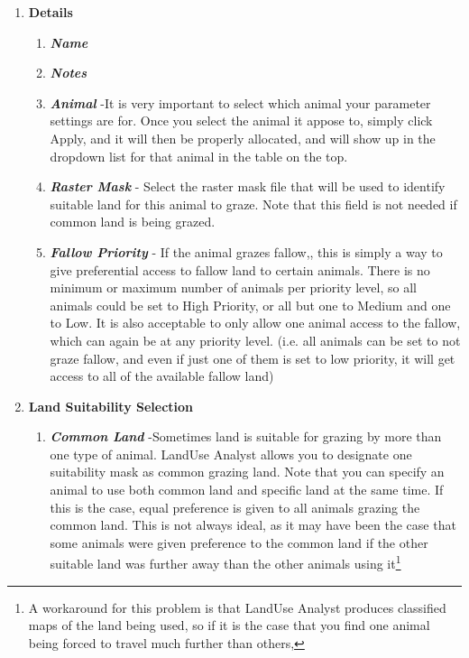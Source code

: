   \begin{enumerate}
    \item \textbf{Details}
      \begin{enumerate}
        \item \textit{\textbf{Name}}
        \item \textit{\textbf{Notes}} 
        \item \textit{\textbf{Animal}} -It is very important to select which
animal your parameter settings are for. Once you select the animal it appose to,
simply click Apply, and it will then be properly allocated, and will show up in
the dropdown list for that animal in the table on the top. 
        \item \textit{\textbf{Raster Mask}} - Select the raster mask file that
will be used to identify suitable land for this animal to graze.  Note that this
field is not needed if common land is being grazed.
        \item \textit{\textbf{Fallow Priority}} - If the animal grazes fallow,,
this is simply a way to give preferential access to fallow land to certain
animals.  There is no minimum or maximum number of animals per priority level,
so all animals could be set to High Priority, or all but one to Medium and one
to Low.  It is also acceptable to only allow one animal access to the fallow,
which can again be at any priority level.  (i.e. all animals can be set to not
graze fallow, and even if just one of them is set to low priority, it will get
access to all of the available fallow land)
      \end{enumerate}
    \item \textbf{Land Suitability Selection}
      \begin{enumerate}
        \item \textit{\textbf{Common Land}} -Sometimes land is suitable for
grazing by more than one type of animal. LandUse Analyst allows you to designate
one suitability mask as common grazing land. Note that you can specify an animal
to use both common land and specific land at the same time. If this is the case,
equal preference is given to all animals grazing the common land. This is not
always ideal, as it may have been the case that some animals were given
preference to the common land if the other suitable land was further away than
the other animals using it\footnote{A workaround for this problem is that
LandUse Analyst produces classified maps of the land being used, so if it is the
case that you find one animal being forced to travel much further than others,
}
\end{enumerate}
\end{enumerate}
